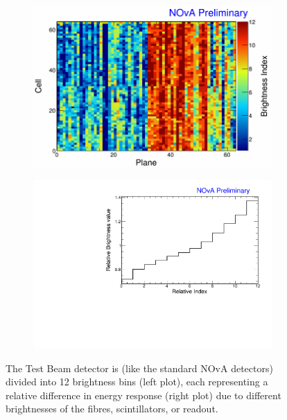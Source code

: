 \begin{figure}[hbtp]
\centering
\begin{subfigure}[b]{0.495\textwidth}
\centering
\includegraphics[width=\textwidth]{Plots/NOvAExperiment/BrightnessIndex.png}
\end{subfigure}
\begin{subfigure}[b]{0.495\textwidth}
\centering
\includegraphics[width=\textwidth]{Plots/NOvAExperiment/BrightnessIndexToValue.pdf}
\end{subfigure}
\caption{The Test Beam detector is (like the standard NOvA detectors) divided into 12 brightness bins (left plot), each representing a relative difference in energy response (right plot) due to different brightnesses of the fibres, scintillators, or readout.}
\label{figFiberBrightnessBins}
\end{figure}

